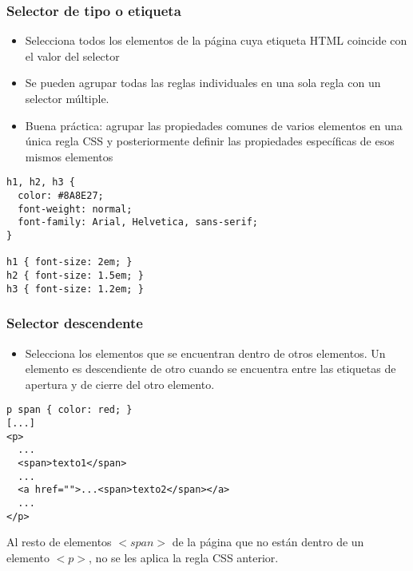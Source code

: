 
\begin{frame}[fragile]
\frametitle{Selector de tipo o etiqueta}

\begin{itemize}
  \item Selecciona todos los elementos de la página cuya etiqueta HTML coincide con el valor del selector
  \item Se pueden agrupar todas las reglas individuales en una sola regla con un selector múltiple.
  \item Buena práctica: agrupar las propiedades comunes de varios elementos en una única regla CSS y posteriormente definir las propiedades específicas de esos mismos elementos
\end{itemize}

{\footnotesize
\begin{verbatim}
h1, h2, h3 {
  color: #8A8E27;
  font-weight: normal;
  font-family: Arial, Helvetica, sans-serif;
}
 
h1 { font-size: 2em; }
h2 { font-size: 1.5em; }
h3 { font-size: 1.2em; }
\end{verbatim}
}

\end{frame}


\begin{frame}[fragile]
\frametitle{Selector descendente}

\begin{itemize}
  \item Selecciona los elementos que se encuentran dentro de otros elementos. Un elemento es descendiente de otro cuando se encuentra entre las etiquetas de apertura y de cierre del otro elemento.
\end{itemize}

\begin{verbatim}
p span { color: red; }
[...]
<p>
  ...
  <span>texto1</span>
  ...
  <a href="">...<span>texto2</span></a>
  ...
</p>
\end{verbatim}

Al resto de elementos $<span>$ de la página que no están dentro de un elemento $<p>$, no se les aplica la regla CSS anterior.

\end{frame}


